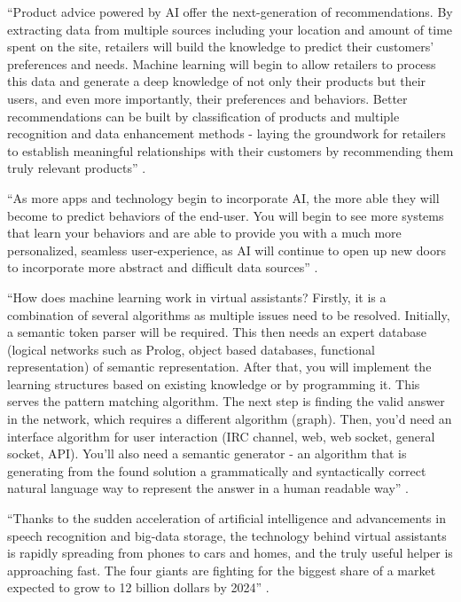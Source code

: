 ``Product advice powered by AI offer the next-generation of recommendations. By extracting data from multiple sources including your location and amount of time spent on the site, retailers will build the knowledge to predict their customers' preferences and needs. Machine learning will begin to allow retailers to process this data and generate a deep knowledge of not only their products but their users, and even more importantly, their preferences and behaviors. Better recommendations can be built by classification of products and multiple recognition and data enhancement methods - laying the groundwork for retailers to establish meaningful relationships with their customers by recommending them truly relevant products'' \cite{Hard2014applications}.

``As more apps and technology begin to incorporate AI, the more able they will become to predict behaviors of the end-user. You will begin to see more systems that learn your behaviors and are able to provide you with a much more personalized, seamless user-experience, as AI will continue to open up new doors to incorporate more abstract and difficult data sources'' \cite{Hard2014applications}.

``How does machine learning work in virtual assistants? Firstly, it is a combination of several algorithms as multiple issues need to be resolved. Initially, a semantic token parser will be required. This then needs an expert database (logical networks such as Prolog, object based databases, functional representation) of semantic representation. After that, you will implement the learning structures based on existing knowledge or by programming it. This serves the pattern matching algorithm. The next step is finding the valid answer in the network, which requires a different algorithm (graph). Then, you'd need an interface algorithm for user interaction (IRC channel, web, web socket, general socket, API). You'll also need a semantic generator - an algorithm that is generating from the found solution a grammatically and syntactically correct natural language way to represent the answer in a human readable way'' \cite{Srivastava2016upswing}.

``Thanks to the sudden acceleration of artificial intelligence and advancements in speech recognition and big-data storage, the technology behind virtual assistants is rapidly spreading from phones to cars and homes, and the truly useful helper is approaching fast. The four giants are fighting for the biggest share of a market expected to grow to 12 billion dollars by 2024'' \cite{Baron2017assistants}.

